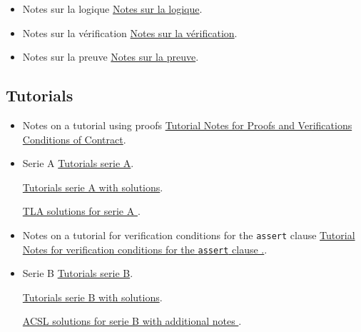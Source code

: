 \documentclass[ 12pt]{article}
\begin{document}
  \begin{itemize}
  \item[]   Notes sur la logique
    \href{http://mery54.github.io/teaching/movex/lecturesnotes/preprint-chapterlogique.pdf}{Notes sur la logique}.

     \item[]   Notes sur la vérification
    \href{http://mery54.github.io/teaching/movex/lecturesnotes/preprint-chapterverification.pdf}{Notes
      sur la vérification}.

     \item[]   Notes sur la preuve
    \href{http://mery54.github.io/teaching/movex/lecturesnotes/preprint-chapterprouver.pdf}{Notes
      sur la preuve}.

  \end{itemize}


  

\subsection{Tutorials}



\begin{itemize}
  
\item[]  Notes on a tutorial using proofs 
    \href{http://mery54.github.io/teaching/movex/lecturesnotes/notestuto3.pdf}{Tutorial
      Notes for Proofs and Verifications Conditions of Contract}.

  \item[]   Serie  A
    \href{http://mery54.github.io/teaching/movex/lecturesnotes/movexserieA.pdf}{Tutorials 
      serie A}.

          \href{http://mery54.github.io/teaching/movex/lecturesnotes/correctionmovexserieA.pdf}{Tutorials 
      serie A with solutions}. 

    
        \href{http://mery54.github.io/teaching/movex/models/serieA.zip}{TLA 
          solutions for serie A }.

\item[]  Notes on a tutorial    for verification  conditions for the
  \texttt{assert} clause 
    \href{http://mery54.github.io/teaching/movex/lecturesnotes/notestuto4.pdf}{Tutorial
      Notes for   verification  conditions for the \texttt{assert} clause .}.

        
\item[]   Serie  B
    \href{http://mery54.github.io/teaching/movex/lecturesnotes/movexserieB.pdf}{Tutorials 
      serie B}.

      \href{http://mery54.github.io/teaching/movex/lecturesnotes/correctionmovexserieB.pdf}{Tutorials 
            serie B with solutions}. 

           \href{http://mery54.github.io/teaching/movex/models/serieB.zip}{
             ACSL  
             solutions for serie B with additional notes 
             }.
  \end{itemize}
\end{document}
